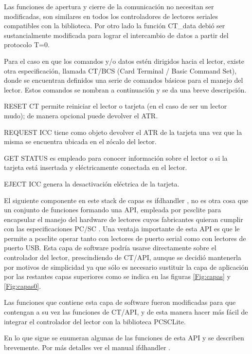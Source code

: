 \newpage
Las funciones de apertura y cierre de la comunicación no necesitan ser modificadas, son similares en todos 
los controladores de lectores seriales compatibles con la biblioteca. Por otro lado la función CT\_data debió ser sustancialmente modificada para lograr el intercambio de datos a partir del protocolo T=0.

\bigskip
Para el caso en que los comandos y/o datos estén dirigidos hacia el lector, existe otra especificación, llamada CT/BCS \cite{ctbcs} (Card Terminal / Basic Command Set), donde se encuentran definidos una serie de comandos básicos para el manejo del lector. Estos comandos se nombran a continuación y se da una breve descripción.

\bigskip
RESET CT permite reiniciar el lector o tarjeta (en el caso de ser un lector mudo); de manera opcional puede devolver el ATR.

REQUEST ICC tiene como objeto devolver el ATR de la tarjeta una vez que la misma se encuentra ubicada en el zócalo del lector.

GET STATUS es empleado para conocer información sobre el lector o si la tarjeta está insertada y eléctricamente conectada en el lector. 

EJECT ICC genera la desactivación eléctrica de la tarjeta.

\bigskip
{}
El siguiente componente en este stack de capas es ifdhandler \cite{ifdhandler}, no es otra cosa que un conjunto de funciones formando una API, empleada por pcsclite para encapsular el manejo del hardware de  lectores cuyos fabricantes quieran cumplir con las especificaciones PC/SC \cite{pcsclite_esp}. Una ventaja importante de esta API es que le permite a pcsclite operar tanto con lectores de puerto serial como con lectores de puerto USB.
Esta capa de software podría usarse directamente sobre el controlador del lector, prescindiendo de CT/API, aunque se decidió mantenerla por motivos de simplicidad ya que sólo es necesario sustituir la capa de aplicación por las restantes capas superiores como se indica en las figuras \ref{Fig:capas} y \ref{Fig:capas0}.

\bigskip
Las funciones que contiene esta capa de software fueron modificadas para que contengan a su vez las funciones de CT/API, y de esta manera hacer más fácil de integrar el controlador del lector con la biblioteca PCSCLite.

\bigskip
En lo que sigue se enumeran algunas de las funciones de esta API y se describen brevemente. Por más detalles ver el manual ifdhandler \cite{ifdhandler}.

